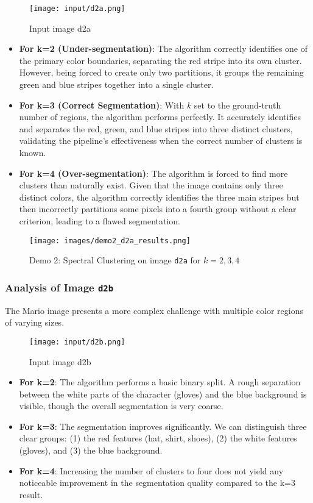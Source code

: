 \documentclass[12pt,a4paper]{article}
\begin{document}
{\begin{figure}[H]
    \centering
    \texttt{[image: input/d2a.png]}
    \caption{Input image d2a}
    \label{fig:input_d2a}
\end{figure}

\begin{itemize}
    \item \textbf{For k=2 (Under-segmentation)}: The algorithm correctly identifies one of the primary color boundaries, separating the red stripe into its own cluster. However, being forced to create only two partitions, it groups the remaining green and blue stripes together into a single cluster.
    \item \textbf{For k=3 (Correct Segmentation)}: With $k$ set to the ground-truth number of regions, the algorithm performs perfectly. It accurately identifies and separates the red, green, and blue stripes into three distinct clusters, validating the pipeline's effectiveness when the correct number of clusters is known.
    \item \textbf{For k=4 (Over-segmentation)}: The algorithm is forced to find more clusters than naturally exist. Given that the image contains only three distinct colors, the algorithm correctly identifies the three main stripes but then incorrectly partitions some pixels into a fourth group without a clear criterion, leading to a flawed segmentation.
\end{itemize}

\begin{figure}[H]
    \centering
    \texttt{[image: images/demo2\_d2a\_results.png]}
    \caption{Demo 2: Spectral Clustering on image \texttt{d2a} for $k=2,3,4$}
    \label{fig:demo2_d2a_results}
\end{figure}

\subsubsection{Analysis of Image \texttt{d2b}}
The Mario image presents a more complex challenge with multiple color regions of varying sizes.

\begin{figure}[H]
    \centering
    \texttt{[image: input/d2b.png]}
    \caption{Input image d2b}
    \label{fig:input_d2b}
\end{figure}

\begin{itemize}
    \item \textbf{For k=2}: The algorithm performs a basic binary split. A rough separation between the white parts of the character (gloves) and the blue background is visible, though the overall segmentation is very coarse.
    \item \textbf{For k=3}: The segmentation improves significantly. We can distinguish three clear groups: (1) the red features (hat, shirt, shoes), (2) the white features (gloves), and (3) the blue background.
    \item \textbf{For k=4}: Increasing the number of clusters to four does not yield any noticeable improvement in the segmentation quality compared to the k=3 result. 
\end{itemize}

}
\end{document}
